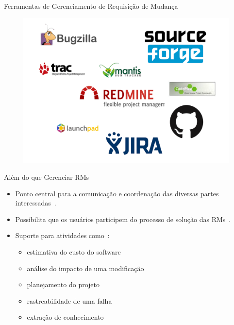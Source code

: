 \documentclass[t,14pt,mathserif]{beamer}
\begin{document}
\begin{frame}{Ferramentas de Gerenciamento de Requisição de Mudança}
		\begin{figure}[hbtp]
			\centering
			\includegraphics[scale=.3]{../img/issue-tracking-sytem.png}
		\end{figure}
\end{frame}
\begin{frame}{Além do que Gerenciar RMs}
	\begin{itemize}
        \item Ponto central para a comunicação e coordenação das diversas partes
            interessadas~\cite{Bertram:2010:CCB:1718918.1718972}.
        \item Possibilita que os usuários participem do processo de solução das
              RMs~\cite{Breu:2010:INB:1718918.1718973}.
        \item Suporte para atividades como~\cite{cavalcanti2013bug}:
            \begin{itemize}
                \item estimativa do custo do software
                \item análise do impacto de uma modificação
                \item planejamento do projeto
                \item rastreabilidade de uma falha
                \item extração de conhecimento
            \end{itemize}
      \end{itemize}
\end{frame}
\end{document}
